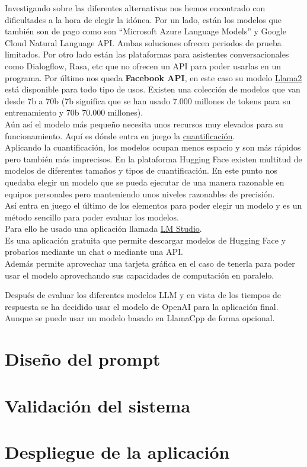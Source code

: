 Investigando sobre las diferentes alternativas nos hemos encontrado con 
dificultades a la hora de elegir la idónea.
Por un lado, están los modelos que también son de pago como son ``Microsoft Azure Language Models'' 
y Google Cloud Natural Language API. Ambas soluciones ofrecen periodos de prueba limitados.
Por otro lado están las plataformas para asistentes conversacionales como Dialogflow, Rasa, etc 
que no ofrecen un API para poder usarlas en un programa.
Por último nos queda \textbf{Facebook API}, en este caso su modelo 
\href{https://github.com/facebookresearch/llama}{Llama2} está disponible para todo tipo de usos.
Existen una colección de modelos que van desde 7b a 70b (7b significa que se han usado 
7.000 millones de tokens para su entrenamiento y 70b 70.000 millones).\\
Aún así el modelo más pequeño necesita unos recursos muy elevados para su funcionamiento. 
Aquí es dónde entra en juego la \href{https://es.wikipedia.org/wiki/Cuantificaci%C3%B3n_digital}{cuantificación}.\\
Aplicando la cuantificación, los modelos ocupan menos espacio y son más rápidos pero también más imprecisos.
En la plataforma Hugging Face existen multitud de modelos de diferentes tamaños y tipos de cuantificación.
En este punto nos quedaba elegir un modelo que se pueda ejecutar de una manera razonable 
en equipos personales pero manteniendo unos niveles razonables de precisión.\\
Así entra en juego el último de los elementos para poder elegir un modelo y 
es un método sencillo para poder evaluar los modelos.\\
Para ello he usado una aplicación llamada \href{https://lmstudio.ai/}{LM Studio}.\\ 
Es una aplicación gratuita que permite descargar modelos de Hugging Face y 
probarlos mediante un chat o mediante una API.\\
Además permite aprovechar una tarjeta gráfica en el caso de tenerla 
para poder usar el modelo aprovechando sus capacidades de computación en paralelo.

Después de evaluar los diferentes modelos LLM y en vista de los tiempos de respuesta se ha decidido usar el modelo 
de OpenAI para la aplicación final. Aunque se puede usar un modelo basado en LlamaCpp de forma opcional.

\section{Diseño del prompt}


\section{Validación del sistema}


\section{Despliegue de la aplicación}


